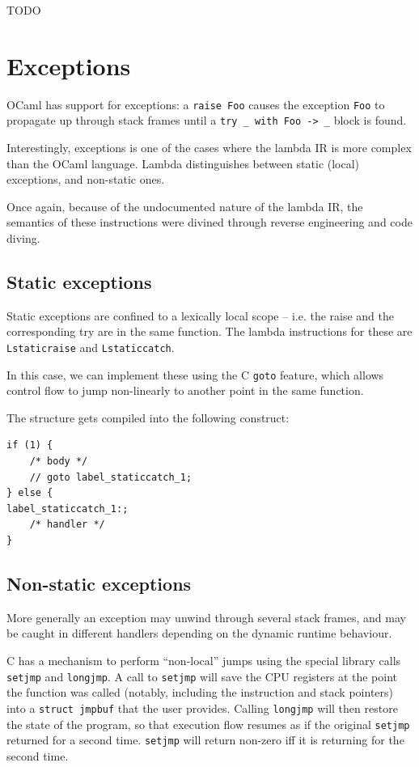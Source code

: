 \documentclass[12pt,a4paper,twoside,openright]{report}
\begin{document}
TODO

\section{Exceptions}\label{exceptions}

OCaml has support for exceptions: a \lstinline!raise Foo! causes the
exception \lstinline!Foo! to propagate up through stack frames until a
\lstinline!try _ with Foo -> _! block is found.

Interestingly, exceptions is one of the cases where the lambda IR is more
complex than the OCaml language. Lambda distinguishes between static (local)
exceptions, and non-static ones.

Once again, because of the undocumented nature of the lambda IR, the semantics
of these instructions were divined through reverse engineering and code diving.

\subsection{Static exceptions}

Static exceptions are confined to a lexically local scope -- i.e. the raise and
the corresponding try are in the same function. The lambda instructions for
these are \lstinline!Lstaticraise! and \lstinline!Lstaticcatch!.

In this case, we can implement these using the C \lstinline!goto! feature,
which allows control flow to jump non-linearly to another point in the same
function.

The structure gets compiled into the following construct:

\begin{lstlisting}
if (1) {
    /* body */
    // goto label_staticcatch_1;
} else {
label_staticcatch_1:;
    /* handler */
}
\end{lstlisting}

\subsection{Non-static exceptions}

More generally an exception may unwind through several stack frames, and may be
caught in different handlers depending on the dynamic runtime behaviour.

C has a mechanism to perform ``non-local'' jumps using the special library
calls \lstinline!setjmp! and \lstinline!longjmp!. A call to \lstinline!setjmp!
will save the CPU registers at the point the function was called (notably,
including the instruction and stack pointers) into a \lstinline!struct jmpbuf!
that the user provides. Calling \lstinline!longjmp! will then restore the state
of the program, so that execution flow resumes as if the original
\lstinline!setjmp! returned for a second time. \lstinline!setjmp! will return
non-zero iff it is returning for the second time.
\end{document}

